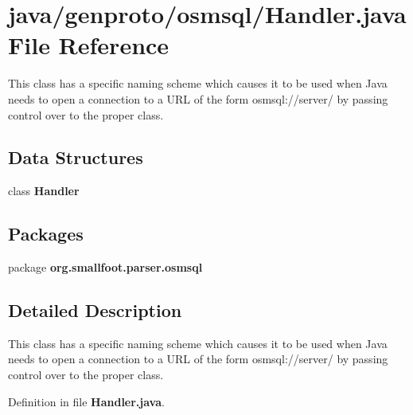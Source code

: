 \section{java/genproto/osmsql/\+Handler.java File Reference}
\label{genproto_2osmsql_2Handler_8java}


This class has a specific naming scheme which causes it to be used when Java needs to open a connection to a U\+R\+L of the form osmsql\+://server/ by passing control over to the proper class.  


\subsection*{Data Structures}
\begin{DoxyCompactItemize}
\item 
class {\bf Handler}
\end{DoxyCompactItemize}
\subsection*{Packages}
\begin{DoxyCompactItemize}
\item 
package {\bf org.\+smallfoot.\+parser.\+osmsql}
\end{DoxyCompactItemize}


\subsection{Detailed Description}
This class has a specific naming scheme which causes it to be used when Java needs to open a connection to a U\+R\+L of the form osmsql\+://server/ by passing control over to the proper class. 



Definition in file {\bf Handler.\+java}.

